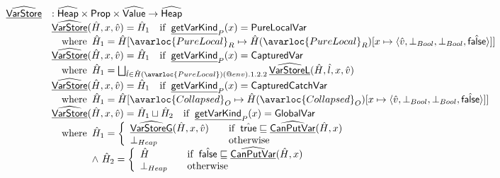 \[\begin{array}{ll}
\ahf{VarStore} & : \aHeap \times \SF{Prop} \times \aValue \rightarrow \aHeap\\
& \ahf{VarStore}(\hat{H}, x, \hat{v}) = \hat{H}_1 \quad\ifc{\chf{getVarKind}_P(x) = \SF{PureLocalVar}} \\
& \quad\wherec{\hat{H}_1 = \hat{H}[\avarloc{PureLocal}_R \mapsto \hat{H}(\avarloc{PureLocal}_R)
    [x \mapsto \langle \hat{v},\bot_{Bool},\bot_{Bool},\afalse \rangle]]} \\
& \ahf{VarStore}(\hat{H}, x, \hat{v}) = \hat{H}_1 \quad\ifc{\chf{getVarKind}_P(x) = \SF{CapturedVar}} \\
& \quad\wherec{\hat{H}_1 = \bigsqcup_{\hat{l}\in\hat{H}(\avarloc{PureLocal})(\varprop{env}).1.2.2} \ahf{VarStoreL}(\hat{H},\hat{l},x,\hat{v})} \\
& \ahf{VarStore}(\hat{H}, x, \hat{v}) = \hat{H}_1 \quad\ifc{\chf{getVarKind}_P(x) = \SF{CapturedCatchVar}} \\
& \quad\wherec{\hat{H}_1 = \hat{H}[\avarloc{Collapsed}_O \mapsto \hat{H}(\avarloc{Collapsed}_O)
    [x \mapsto \langle \hat{v},\bot_{Bool},\bot_{Bool},\afalse \rangle]]} \\
& \ahf{VarStore}(\hat{H}, x, \hat{v}) = \hat{H}_1 \sqcup \hat{H}_2 
    \quad\ifc{\chf{getVarKind}_P(x) = \SF{GlobalVar}} \\
& \quad\wherec{
  \hat{H}_1 = \left\{
    \begin{array}{ll}
      \ahf{VarStoreG}(\hat{H}, x, \hat{v}) & \quad\ifc{\atrue\sqsubseteq\ahf{CanPutVar}(\hat{H}, x)} \\
      \bot_{Heap} & \quad\owc
    \end{array}
  \right. \\
  \land\ \hat{H}_2 = \left\{
    \begin{array}{ll}
      \hat{H} & \quad\ifc{\afalse \sqsubseteq \ahf{CanPutVar}(\hat{H}, x)} \\
      \bot_{Heap} & \quad\owc
    \end{array}
  \right. \\
} \\
\\


\end{array}\]
